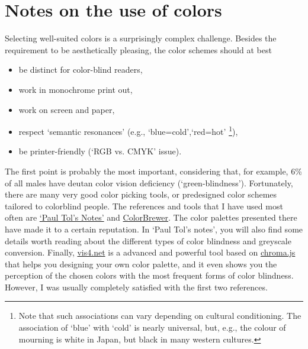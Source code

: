 \chapter{Notes on the use of colors}

Selecting well-suited colors is a surprisingly complex challenge. Besides the requirement to be aesthetically pleasing, the color schemes should at best
\begin{itemize}
	\item be distinct for color-blind readers,
	\item work in monochrome print out,
	\item work on screen and paper,
	\item respect `semantic resonances' \cite{linSelectingSemanticallyResonantColors2013} (e.g., `blue=cold',`red=hot' \footnote{Note that such associations can vary depending on cultural conditioning. The association of `blue' with `cold' is nearly universal, but, e.g., the colour of mourning is white in Japan, but black in many western cultures.}),
	\item be printer-friendly (`RGB vs. CMYK' issue).
\end{itemize}
The first point is probably the most important, considering that, for example, 6\% of all males have deutan color vision deficiency (`green-blindness'). Fortunately, there are many very good color picking tools, or predesigned color schemes tailored to colorblind people.
The references and tools that I have used most often are \href{https://personal.sron.nl/~pault/#sec:greyscale_conversion}{`Paul Tol's Notes'} and \href{https://colorbrewer2.org/#type=sequential&scheme=BuGn&n=3}{ColorBrewer}. 
The color palettes presented there have made it to a certain reputation. In `Paul Tol's notes', you will also find some details worth reading about the different types of color blindness and greyscale conversion.
Finally, \href{https://www.vis4.net/palettes/}{vis4.net} is a advanced and powerful tool based on \href{https://github.com/gka/chroma.js}{chroma.js} that helps you designing your own color palette, and it even shows you the perception of the chosen colors with the most frequent forms of color blindness. However, I was usually completely satisfied with the first two references.

